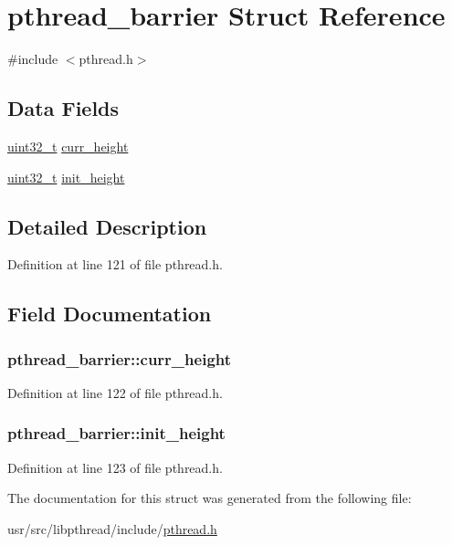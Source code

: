 \hypertarget{structpthread__barrier}{\section{pthread\+\_\+barrier Struct Reference}
\label{structpthread__barrier}
}


{\ttfamily \#include $<$pthread.\+h$>$}

\subsection*{Data Fields}
\begin{DoxyCompactItemize}
\item 
\hyperlink{aplus_8h_a53a0df51603c77c2aa5b9ea61b606a82}{uint32\+\_\+t} \hyperlink{structpthread__barrier_a3b8e6f276f11a62fb77525fe5d11b18c}{curr\+\_\+height}
\item 
\hyperlink{aplus_8h_a53a0df51603c77c2aa5b9ea61b606a82}{uint32\+\_\+t} \hyperlink{structpthread__barrier_a71938bf4346ecc8a2f997f18df267ae0}{init\+\_\+height}
\end{DoxyCompactItemize}


\subsection{Detailed Description}


Definition at line 121 of file pthread.\+h.



\subsection{Field Documentation}
\hypertarget{structpthread__barrier_a3b8e6f276f11a62fb77525fe5d11b18c}{
\subsubsection[{curr\+\_\+height}]{ pthread\+\_\+barrier\+::curr\+\_\+height}}\label{structpthread__barrier_a3b8e6f276f11a62fb77525fe5d11b18c}


Definition at line 122 of file pthread.\+h.

\hypertarget{structpthread__barrier_a71938bf4346ecc8a2f997f18df267ae0}{
\subsubsection[{init\+\_\+height}]{ pthread\+\_\+barrier\+::init\+\_\+height}}\label{structpthread__barrier_a71938bf4346ecc8a2f997f18df267ae0}


Definition at line 123 of file pthread.\+h.



The documentation for this struct was generated from the following file\+:\begin{DoxyCompactItemize}
\item 
usr/src/libpthread/include/\hyperlink{pthread_8h}{pthread.\+h}\end{DoxyCompactItemize}
